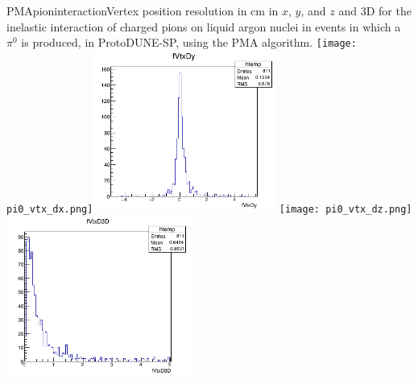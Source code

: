 \begin{cdrfigure}{PMApioninteraction}{Vertex position resolution in cm in $x$, $y$, and $z$ and 3D for the
  inelastic interaction of charged pions on liquid argon nuclei in events in which a $\pi^0$ is produced, in
  ProtoDUNE-SP, using the PMA algorithm.}
\texttt{[image: pi0\_vtx\_dx.png]}\includegraphics[width=0.45\textwidth]{figures/pi0_vtx_dy.png}
\texttt{[image: pi0\_vtx\_dz.png]}\includegraphics[width=0.45\textwidth]{figures/pi0_vtx3d.png}
\end{cdrfigure}



